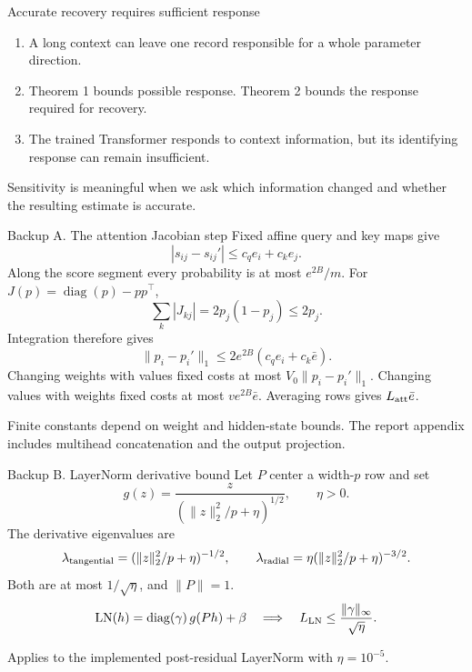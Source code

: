 \documentclass[aspectratio=169,11pt]{beamer}
\newcommand{\source}[1]{\par\vfill{\color{muted}\tiny #1}}
\begin{document}
\begin{frame}{Accurate recovery requires sufficient response}
\begin{enumerate}
\setlength{\itemsep}{5mm}
\item A long context can leave one record responsible for a whole parameter direction.
\item Theorem 1 bounds possible response.
Theorem 2 bounds the response required for recovery.
\item The trained Transformer responds to context information,
but its identifying response can remain insufficient.
\end{enumerate}
\vspace{6mm}
{\color{teal}\large Sensitivity is meaningful when we ask which information changed
and whether the resulting estimate is accurate.}
\end{frame}

\appendix
{}

\begin{frame}[noframenumbering]{Backup A. The attention Jacobian step}
\small
Fixed affine query and key maps give
\[
|s_{ij}-s_{ij}'|\le c_q e_i+c_k e_j.
\]
Along the score segment every probability is at most \(e^{2B}/m\).
For \(J(p)=\operatorname{diag}(p)-pp^\top\),
\[
\sum_k|J_{kj}|=2p_j(1-p_j)\le2p_j.
\]
Integration therefore gives
\[
\|p_i-p_i'\|_1\le2e^{2B}(c_qe_i+c_k\bar e).
\]
Changing weights with values fixed costs at most \(V_0\|p_i-p_i'\|_1\).
Changing values with weights fixed costs at most \(ve^{2B}\bar e\).
Averaging rows gives \(L_{\rm att}\bar e\).
\source{Finite constants depend on weight and hidden-state bounds.
The report appendix includes multihead concatenation and the output projection.}
\end{frame}
\begin{frame}[noframenumbering]{Backup B. LayerNorm derivative bound}
\small
Let \(P\) center a width-\(p\) row and set
\[
g(z)=\frac{z}{(\|z\|_2^2/p+\eta)^{1/2}},\qquad \eta>0.
\]
The derivative eigenvalues are
\[
\lambda_{\rm tangential}
 =(\|z\|_2^2/p+\eta)^{-1/2},
\qquad
\lambda_{\rm radial}
 =\eta(\|z\|_2^2/p+\eta)^{-3/2}.
\]
Both are at most \(1/\sqrt{\eta}\), and \(\|P\|=1\).
\[
\mathrm{LN}(h)=\operatorname{diag}(\gamma)\,g(Ph)+\beta
\quad\Longrightarrow\quad
L_{\rm LN}\le\frac{\|\gamma\|_\infty}{\sqrt{\eta}}.
\]
\source{Applies to the implemented post-residual LayerNorm with \(\eta=10^{-5}\).}
\end{frame}
\end{document}
